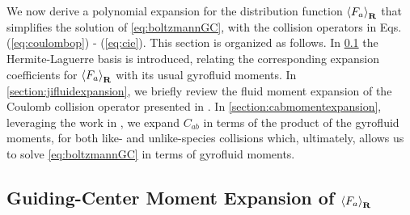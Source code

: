 {We now derive a polynomial expansion for the distribution function $\left< F_a \right>_{\mathbf R}$ that simplifies the solution of \cref{eq:boltzmannGC}, with the collision operators in Eqs. (\ref{eq:coulombop}) - (\ref{eq:cie}).
This section is organized as follows.
In \cref{section:gcmoment} the Hermite-Laguerre basis is introduced, relating the corresponding expansion coefficients for $\left< F_a \right>_{\mathbf R}$ with its usual gyrofluid moments.
In \cref{section:jifluidexpansion}, we briefly review the fluid moment expansion of the Coulomb collision operator presented in \citet{Ji2006, Ji2008}.
In \cref{section:cabmomentexpansion}, leveraging the work in  \citet{Ji2006, Ji2008}, we expand $C_{ab}$ in terms of the product of the gyrofluid moments, for both like- and unlike-species collisions which, ultimately, allows us to solve \cref{eq:boltzmannGC} in terms of gyrofluid moments.

\subsection{Guiding-Center Moment Expansion of \texorpdfstring{$\left< F_a \right>_{\mathbf R}$}{}}
\label{section:gcmoment}

}
